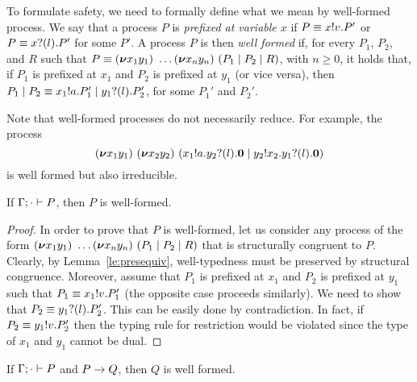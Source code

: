 To formulate safety, we need to formally define what we mean by
well-formed process.  We say that a process \( P \) is \emph{prefixed
  at variable \( x \)} if \( P\equiv x ! v . P' \) or
\( P\equiv x ? (l) . P' \) for some $P'$.
%
A process $P$ is then \emph{well formed} if, for every $P_1$, $P_2$,
and $R$ such that
\( P\equiv (\bm{\nu} x_1y_1)~\dots
  (\bm{\nu} x_ny_n)~(P_1 \mid P_2 \mid R) \), with
\( n \geq 0 \), it holds that, if \( P_1 \) is prefixed at \( x_1 \)
and \( P_2 \) is prefixed at \( y_1 \) (or vice versa), then
\( P_1 \mid P_2
\equiv x_1 ! a . P_1' \mid y_1 ? (l) . P_2' \), for some
$P_1'$ and $P_2'$.

Note that well-formed processes do not necessarily reduce. For example, the process
\begin{equation*}
  (\bm{\nu} x_1y_1)~(\bm{\nu} x_2y_2)~(x_1 ! a . y_2 ? (l) . \bm{0} \mid y_2 ! x_2 . y_1 ? (l) . \bm{0})
\end{equation*}
is well formed but also irreducible.

\begin{theorem}
  If \( \Gamma;\cdot \vdash P \), then \( P \) is well-formed.
\end{theorem}
\begin{proof}
  In order to prove that $P$ is well-formed, let us consider any
  process of the form
  $(\bm{\nu} x_1y_1)~\dots
    (\bm{\nu} x_ny_n)~(P_1 \mid P_2 \mid R)$ that is
  structurally congruent to $P$. Clearly, by Lemma~\ref{le:presequiv},
  well-typedness must be preserved by structural congruence. Moreover,
  assume that $P_1$ is prefixed at $x_1$ and $P_2$ is prefixed at
  $y_1$ such that $P_1 \equiv x_1 ! v . P_1'$ (the opposite
  case proceeds similarly). We need to show that
  $P_2 \equiv y_1 ? (l) . P_2'$. This can be easily done by
  contradiction. In fact, if $P_2 \equiv y_1 ! v . P_2'$ then
  the typing rule for restriction would be violated since the type of
  $x_1$ and $y_1$ cannot be dual.
\end{proof}

\begin{corollary}
  If \( \Gamma;\cdot \vdash P \) and \( P \rightarrow Q \), then \( Q \) is well formed.
\end{corollary}
